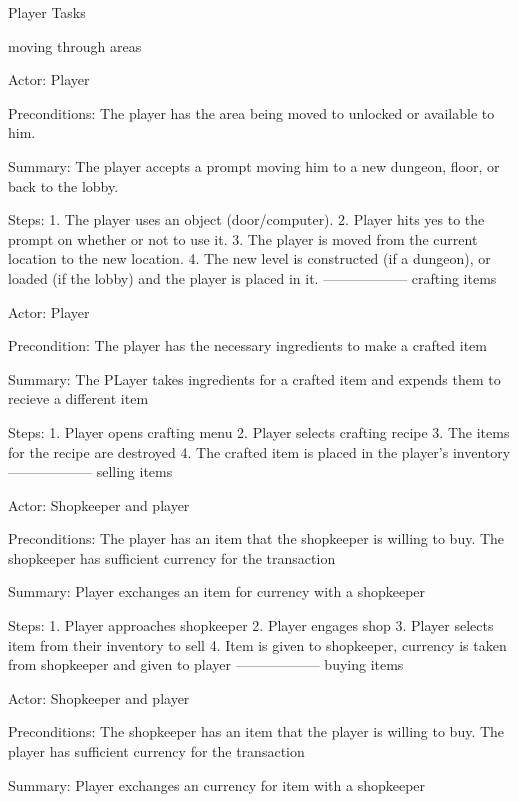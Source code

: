 \documentclass[12pt]{report}
\begin{document}
\begin{section}{Player Tasks} %

moving through areas %

Actor: Player

Preconditions: The player has the area being moved to unlocked or available to him.

Summary: The player accepts a prompt moving him to a new dungeon, floor, or back to the lobby.

Steps:
1. The player uses an object (door/computer).
2. Player hits yes to the prompt on whether or not to use it.
3. The player is moved from the current location to the new location.
4. The new level is constructed (if a dungeon), or loaded (if the lobby) and the player is placed in it.
------------------
crafting items %

Actor: Player

Precondition: The player has the necessary ingredients to make a crafted item

Summary: The PLayer takes ingredients for a crafted item and expends them to recieve a different item

Steps:
1. Player opens crafting menu
2. Player selects crafting recipe
3. The items for the recipe are destroyed
4. The crafted item is placed in the player's inventory
------------------
selling items %

Actor: Shopkeeper and player

Preconditions: The player has an item that the shopkeeper is willing to buy. The shopkeeper has sufficient
currency for the transaction

Summary: Player exchanges an item for currency with a shopkeeper

Steps: 
1. Player approaches shopkeeper
2. Player engages shop
3. Player selects item from their inventory to sell
4. Item is given to shopkeeper, currency is taken from shopkeeper and given to player
------------------
buying items %

Actor: Shopkeeper and player

Preconditions: The shopkeeper has an item that the player is willing to buy. The player has sufficient
currency for the transaction

Summary: Player exchanges an currency for item with a shopkeeper


\end{section}
\end{document}
